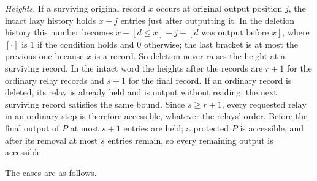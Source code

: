 \documentclass[11pt,letterpaper]{article}
\begin{document}
\emph{Heights.} If a surviving original record \(x\) occurs at original
output position \(j\), the intact lazy history holds \(x-j\) entries
just after outputting it. In the deletion history this number becomes
\(x-[d\le x]-j+[d\text{ was output before }x]\), where \([\cdot]\) is
\(1\) if the condition holds and \(0\) otherwise; the last bracket is at
most the previous one because \(x\) is a record. So deletion never
raises the height at a surviving record. In the intact word the heights
after the records are \(r+1\) for the ordinary relay records and \(s+1\)
for the final record. If an ordinary record is deleted, its relay is
already held and is output without reading; the next surviving record
satisfies the same bound. Since \(s\ge r+1\), every requested relay in
an ordinary step is therefore accessible, whatever the relays' order.
Before the final output of \(P\) at most \(s+1\) entries are held; a
protected \(P\) is accessible, and after its removal at most \(s\)
entries remain, so every remaining output is accessible.

The cases are as follows.
\end{document}
